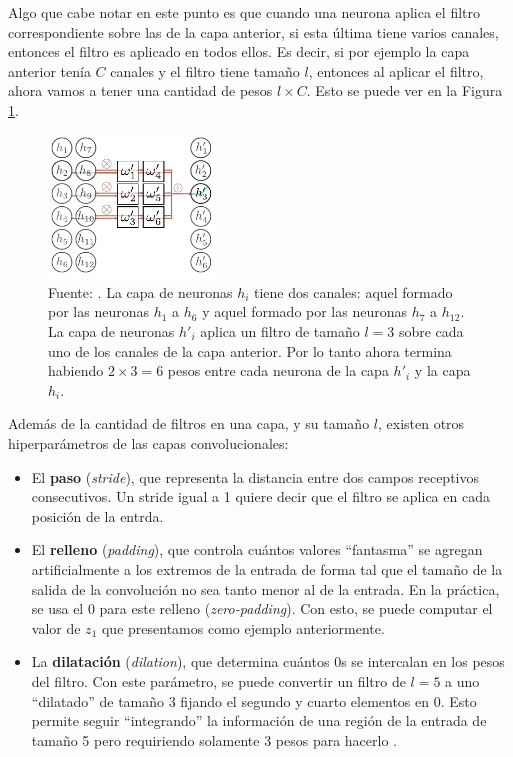 \documentclass[../../main.tex]{subfiles}
\begin{document}
Algo que cabe notar en este punto es que cuando una neurona aplica el filtro
correspondiente sobre las de la capa anterior, si esta última tiene varios canales,
entonces el filtro es aplicado en todos ellos. Es decir, si por ejemplo la capa anterior
tenía \(C\) canales y el filtro tiene tamaño \(l\), entonces al aplicar el filtro, ahora
vamos a tener una cantidad de pesos \(l \times C\). Esto se puede ver en la Figura
\ref{fig:conv-layer-multi-channel}.

\begin{figure}
    \centering
    \includegraphics[width=0.4\textwidth]{figs/conv-layer-multi-channel.png}
    \caption{Fuente: \cite{prince2024understanding}. La capa de neuronas \(h_i\) tiene
    dos canales: aquel formado por las neuronas \(h_1\) a \(h_6\) y aquel formado
    por las neuronas \(h_7\) a \(h_{12}\). La capa de neuronas \(h'_i\) aplica un
    filtro de tamaño \(l=3\) sobre cada uno de los canales de la capa anterior. Por
    lo tanto ahora termina habiendo \(2 \times 3 = 6\) pesos entre cada neurona de la
    capa \(h'_i\) y la capa \(h_i\).}
    \label{fig:conv-layer-multi-channel}
\end{figure}

Además de la cantidad de filtros en una capa, y su tamaño \(l\), existen otros
hiperparámetros de las capas convolucionales: \vspace{-0.25cm}
\begin{itemize}[noitemsep]
    \item El \textbf{paso} (\textit{stride}), que representa la distancia entre dos campos receptivos
    consecutivos. Un stride igual a 1 quiere decir que el filtro se aplica en cada
    posición de la entrda.
    \item El \textbf{relleno} (\textit{padding}), que controla cuántos valores
    ``fantasma'' se agregan artificialmente a los extremos de la entrada de forma tal que
    el tamaño de la salida de la convolución no sea tanto menor al de la entrada. En la
    práctica, se usa el 0 para este relleno (\textit{zero-padding}). Con esto, se
    puede computar el valor de \(z_1\) que presentamos como ejemplo anteriormente.
    \item La \textbf{dilatación} (\textit{dilation}), que determina cuántos 0s se
    intercalan en los pesos del filtro. Con este parámetro, se puede convertir un filtro
    de \(l=5\) a uno ``dilatado'' de tamaño 3 fijando el segundo y cuarto elementos en 0.
    Esto permite seguir ``integrando'' la información de una región de la entrada de
    tamaño 5 pero requiriendo solamente 3 pesos para hacerlo
    \cite{prince2024understanding}.
\end{itemize}
\end{document}
